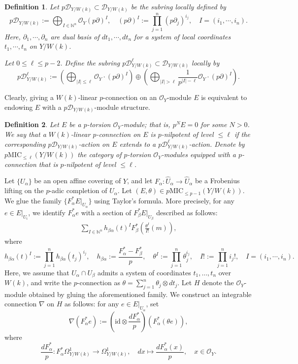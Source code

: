 \documentclass[12pt, a4paper]{article}
\newtheorem{definition}{Definition}[section]
\begin{document}
\begin{definition}
Let $p\mathcal D_{Y/W(k)}\subset\mathcal D_{Y/W(k)}$ be the subring locally defined by
$$
p\mathcal D_{Y/W(k)}:=\bigoplus_{I\in\mathbb N^n}\mathcal O_Y(p\partial)^I,\quad (p\partial)^I:=\prod_{j=1}^n(p\partial_j)^{i_j},\quad I=(i_1,\cdots,i_n).
$$
Here, $\partial_1,\cdots,\partial_n$ are dual basis of $dt_1,\cdots,dt_n$ for a system of local coordinates $t_1,\cdots,t_n$ on $Y/W(k)$.

Let \( 0 \leq \ell \leq p - 2\). Define the subring \( p\mathcal{D}_{Y/W(k)}^\ell \subset \mathcal{D}_{Y/W(k)} \) locally by
\[
p\mathcal{D}_{Y/W(k)}^\ell := 
\left( \bigoplus_{|I| \leq \ell} \mathcal{O}_Y \cdot (p\partial)^I \right)
\oplus 
\left( \bigoplus_{|I| > \ell} \frac{1}{p^{|I| - \ell}} \mathcal{O}_Y \cdot (p\partial)^I \right).
\] 
\end{definition}
Clearly, giving a \( W(k) \)-linear \( p \)-connection on an \( \mathcal{O}_Y \)-module \( E \) is equivalent to endowing \( E \) with a  \( p\mathcal{D}_{Y/W(k)} \)-module structure.
\begin{definition}
Let \( E \) be a \( p \)-torsion \( \mathcal{O}_Y \)-module; that is, \( p^N E = 0 \) for some \( N > 0 \). We say that a \( W(k) \)-linear \( p \)-connection on \( E \) is \( p \)-nilpotent of level \( \leq \ell \) if the corresponding \( p\mathcal{D}_{Y/W(k)} \)-action on \( E \) extends to a \( p\mathcal{D}^\ell_{Y/W(k)} \)-action. Denote by \( p\mathrm{MIC}_{\leq \ell}(Y/W(k)) \) the category of \( p \)-torsion \( \mathcal{O}_Y \)-modules equipped with a \( p \)-connection that is \( p \)-nilpotent of level \( \leq \ell \).
\end{definition}
Let $\{U_\alpha\}$ be an open affine covering of $Y$, and let $F_\alpha:\hat U_\alpha\to \hat U_\alpha$ be a Frobenius lifting on the $p$-adic completion of $U_\alpha$. Let $(E,\theta)\in p\mathrm{MIC}_{\leq p-1}(Y/W(k))$. We glue the family \( \{ F_\alpha^* E|_{U_\alpha} \} \) using Taylor's formula. More precisely, for any $e\in E|_{U_i}$, we identify $F^*_\alpha e$ with a section of $F^*_\beta E|_{U_\beta}$ described as follows:
\begin{eqnarray}\label{Taylor's formula}
\sum_{I\in\mathbb N^n}h_{\beta\alpha}(t)^IF_\beta^*(\frac{\theta^I}{I!}(m)),
\end{eqnarray}
where
$$
h_{\beta\alpha}(t)^I:=\prod_{j=1}^nh_{\beta\alpha}(t_j)^{i_j},\quad h_{\beta\alpha}:=\frac{F_\alpha^*-F_\beta^*}{p},\quad \theta^I:=\prod_{j=1}^n\theta_j^{i_j},\quad I!:=\prod_{j=1}^ni_j!,\quad I=(i_1,\cdots,i_n).
$$
Here, we assume that $U_\alpha \cap U_\beta$ admits a system of coordinates $t_1, \dots, t_n$ over $W(k)$, and write the $p$-connection as $\theta = \sum_{j=1}^n \theta_j \otimes dt_j$. Let $H$ denote the $\mathcal{O}_Y$-module obtained by gluing the aforementioned family. We construct an integrable connection $\nabla$ on $H$ as follows: for any $e\in E|_{U_\alpha}$, set 
$$
\nabla(F^*_\alpha e):=(\mathrm{id}\otimes\frac{dF^*_\alpha}{p})(F^*_\alpha(\theta e)),
$$
where
$$
\frac{dF^*_\alpha}{p}:F^*_\alpha\Omega^1_{Y/W(k)}\to\Omega^1_{Y/W(k)},\quad dx\mapsto \frac{dF^*_\alpha(x)}{p},\quad x\in\mathcal O_Y.
$$
\end{document}
